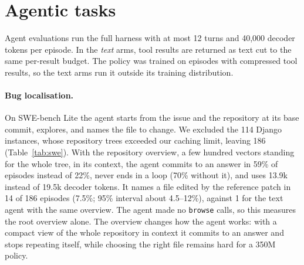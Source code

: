 \documentclass[11pt]{article}
\begin{document}
\begin{table}[!ht]
\centering
\small
\resizebox{\linewidth}{!}{}
\caption{Cost of one question over a context of the given length (tokens; text from a LongMemEval-S
history), released model in bf16 on one NVIDIA GB10 GPU that was shared with another job; medians of
three runs. bgkit, $B$: the context compressed to about $B$ decoder positions (at 110k tokens and
$B=1{,}024$ the 64$\times$ compression cap gives 1{,}820). First token: encoder plus prefill. ms per
token: greedy decoding with the KV cache. Memory: peak CUDA memory beyond the weights. TFLOP: forward
FLOPs, $2 \times \text{parameters} \times \text{tokens}$ over encoder and decoder.}
\label{tab:cost}
\end{table}

\section{Agentic tasks}
\label{sec:agents}

Agent evaluations run the full harness with at most 12 turns and 40{,}000 decoder tokens per episode.
In the \emph{text} arms, tool results are returned as text cut to the same per-result budget. The
policy was trained on episodes with compressed tool results, so the text arms run it outside its
training distribution.

\paragraph{Bug localisation.}
On SWE-bench Lite \citep{jimenez2024swebench} the agent starts from the issue and the repository at
its base commit, explores, and names the file to change. We excluded the 114 Django instances, whose
repository trees exceeded our caching limit, leaving 186 (Table~\ref{tab:swe}). With the repository
overview, a few hundred vectors standing for the whole tree, in its context, the agent commits to an
answer in 59\% of episodes instead of 22\%, never ends in a loop (70\% without it), and uses 13.9k
instead of 19.5k decoder tokens. It names a file edited by the reference patch in 14 of 186 episodes
(7.5\%; 95\% interval about 4.5--12\%), against 1 for the text agent with the same overview. The
agent made no \texttt{browse} calls, so this measures the root overview alone. The overview changes
how the agent works: with a compact view of the whole repository in context it commits to an answer
and stops repeating itself, while choosing the right file remains hard for a 350M policy.
\end{document}
